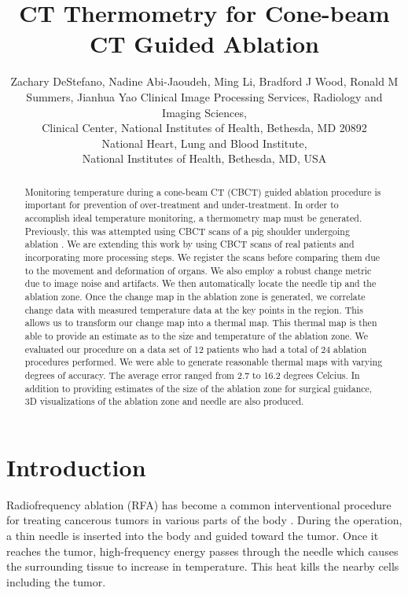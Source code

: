 \documentclass[]{spie}  %
\title{CT Thermometry for Cone-beam CT Guided Ablation}
\author{Zachary DeStefano\supit{a}, Nadine Abi-Jaoudeh\supit{a}, Ming Li\supit{b}, Bradford J Wood\supit{a}, Ronald M Summers\supit{a}, Jianhua Yao\supit{a}
\skiplinehalf
\supit{a}Clinical Image Processing Services, Radiology and Imaging Sciences, \\Clinical Center, National Institutes of Health, Bethesda, MD 20892\\
\supit{b}National Heart, Lung and Blood Institute, \\National Institutes of Health, Bethesda, MD, USA
}
\begin{document}
 
  \maketitle 

\begin{abstract}
Monitoring temperature during a cone-beam CT (CBCT) guided ablation procedure is important for prevention of over-treatment and under-treatment. In order to accomplish ideal temperature monitoring, a thermometry map must be generated.  Previously, this was attempted using CBCT scans of a pig shoulder undergoing ablation \cite{Li13}. We are extending this work by using CBCT scans of real patients and incorporating more processing steps. We register the scans before comparing them due to the movement and deformation of organs. We also employ a robust change metric due to image noise and artifacts. We then automatically locate the needle tip and the ablation zone. Once the change map in the ablation zone is generated, we correlate change data with measured temperature data at the key points in the region. This allows us to transform our change map into a thermal map. This thermal map is then able to provide an estimate as to the size and temperature of the ablation zone. We evaluated our procedure on a data set of 12 patients who had a total of 24 ablation procedures performed. We were able to generate reasonable thermal maps with varying degrees of accuracy. The average error ranged from 2.7 to 16.2 degrees Celcius. In addition to providing estimates of the size of the ablation zone for surgical guidance, 3D visualizations of the ablation zone and needle are also produced.  
\end{abstract}



\section{Introduction}
\label{sec:intro}  %

Radiofrequency ablation (RFA) has become a common interventional procedure for treating cancerous tumors in various parts of the body \cite{Mayo15}. During the operation, a thin needle is inserted into the body and guided toward the tumor. Once it reaches the tumor, high-frequency energy passes through the needle which causes the surrounding tissue to increase in temperature. This heat kills the nearby cells including the tumor. 
\end{document}
